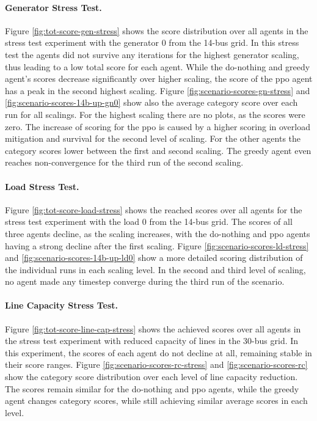 \paragraph{Generator Stress Test.}
Figure \ref{fig:tot-score-gen-stress} shows the score distribution over all agents in the stress test experiment with the generator 0 from the 14-bus grid. In this stress test the agents did not survive any iterations for the highest generator scaling, thus leading to a low total score for each agent. While the do-nothing and greedy agent's scores decrease significantly over higher scaling, the score of the \ac{ppo} agent has a peak in the second highest scaling. Figure \ref{fig:scenario-scores-gn-stress} and \ref{fig:scenario-scores-14b-up-gn0} show also the average category score over each run for all scalings. For the highest scaling there are no plots, as the scores were zero. The increase of scoring for the \ac{ppo} is caused by a higher scoring in overload mitigation and survival for the second level of scaling. For the other agents the category scores lower between the first and second scaling. The greedy agent even reaches non-convergence for the third run of the second scaling.

\paragraph{Load Stress Test.}
Figure \ref{fig:tot-score-load-stress} shows the reached scores over all agents for the stress test experiment with the load 0 from the 14-bus grid. The scores of all three agents decline, as the scaling increases, with the do-nothing and \ac{ppo} agents having a strong decline after the first scaling. Figure \ref{fig:scenario-scores-ld-stress} and \ref{fig:scenario-scores-14b-up-ld0} show a more detailed scoring distribution of the individual runs in each scaling level. In the second and third level of scaling, no agent made any timestep converge during the third run of the scenario.

\paragraph{Line Capacity Stress Test.}
Figure \ref{fig:tot-score-line-cap-stress} shows the achieved scores over all agents in the stress test experiment with reduced capacity of lines in the 30-bus grid. In this experiment, the scores of each agent do not decline at all, remaining stable in their score ranges. Figure \ref{fig:scenario-scores-rc-stress} and \ref{fig:scenario-scores-rc} show the category score distribution over each level of line capacity reduction. The scores remain similar for the do-nothing and \ac{ppo} agents, while the greedy agent changes category scores, while still achieving similar average scores in each level. 

